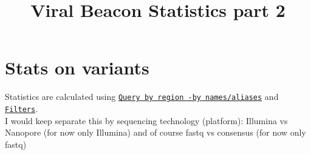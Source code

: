 \documentclass[a4paper, 10pt]{article}        %
\title{Viral Beacon Statistics  part 2}
\begin{document}
\date{}
\maketitle


\section{Stats on variants}


Statistics are calculated using \href{https://github.com/clauw87/virusbeacon/blob/raw_ideas/query_by_region_alias.pdf}{\texttt{Query by region -by names/aliases}} and \href{https://github.com/clauw87/virusbeacon/blob/raw_ideas/filters.pdf}{\texttt{Filters}}.\\

I would keep separate this by sequencing technology (platform): Illumina vs Nanopore (for now only Illumina) and of course fastq vs consensus (for now only fastq)
\end{document}
